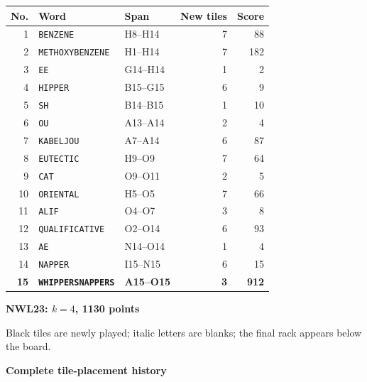 \documentclass[letterpaper]{article}
\begin{document}
\begin{center}
\fontsize{8.5}{8.8}\selectfont
\setlength{\tabcolsep}{4pt}
\renewcommand{\arraystretch}{0.90}
\begin{tabular}{@{}rllrr@{}}\toprule
No. & Word & Span & New tiles & Score\\
\midrule
1 & \texttt{BENZENE} & H8--H14 & 7 & 88\\
2 & \texttt{METHOXYBENZENE} & H1--H14 & 7 & 182\\
3 & \texttt{EE} & G14--H14 & 1 & 2\\
4 & \texttt{HIPPER} & B15--G15 & 6 & 9\\
5 & \texttt{SH} & B14--B15 & 1 & 10\\
6 & \texttt{OU} & A13--A14 & 2 & 4\\
7 & \texttt{KABELJOU} & A7--A14 & 6 & 87\\
8 & \texttt{EUTECTIC} & H9--O9 & 7 & 64\\
9 & \texttt{CAT} & O9--O11 & 2 & 5\\
10 & \texttt{ORIENTAL} & H5--O5 & 7 & 66\\
11 & \texttt{ALIF} & O4--O7 & 3 & 8\\
12 & \texttt{QUALIFICATIVE} & O2--O14 & 6 & 93\\
13 & \texttt{AE} & N14--O14 & 1 & 4\\
14 & \texttt{NAPPER} & I15--N15 & 6 & 15\\
\midrule
\textbf{15} & \textbf{\texttt{WHIPPERSNAPPERS}} & \textbf{A15--O15} & \textbf{3} & \textbf{912}\\
\bottomrule\end{tabular}
\end{center}
\vfill
\clearpage
\begin{center}
{\fontsize{11}{12}\selectfont\bfseries NWL23: $k=4$, 1130 points\par}
\vspace{2pt}
\par
\vspace{1pt}
{\fontsize{7.2}{8}\selectfont Black tiles are newly played; italic letters are blanks; the final rack appears below the board.\par}
\vspace{2pt}
{\fontsize{8.5}{9}\selectfont\bfseries Complete tile-placement history\par}
\end{center}
\end{document}

